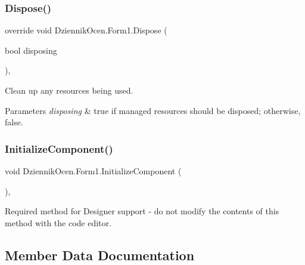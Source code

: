 \mbox{\label{class_dziennik_ocen_1_1_form1_a64a7924e831567e78bb499a6baa0e543}} 
\subsubsection{\texorpdfstring{Dispose()}{Dispose()}}
{\footnotesize\ttfamily override void Dziennik\+Ocen.\+Form1.\+Dispose (\begin{DoxyParamCaption}\item[{bool}]{disposing }\end{DoxyParamCaption})\hspace{0.3cm}{\ttfamily [inline]}, {\ttfamily [protected]}}



Clean up any resources being used. 


\begin{DoxyParams}{Parameters}
{\em disposing} & true if managed resources should be disposed; otherwise, false.\\
\hline
\end{DoxyParams}
\mbox{\label{class_dziennik_ocen_1_1_form1_a25d1f1865febb87fc9186127ca72793c}} 
\subsubsection{\texorpdfstring{Initialize\+Component()}{InitializeComponent()}}
{\footnotesize\ttfamily void Dziennik\+Ocen.\+Form1.\+Initialize\+Component (\begin{DoxyParamCaption}{ }\end{DoxyParamCaption})\hspace{0.3cm}{\ttfamily [inline]}, {\ttfamily [private]}}



Required method for Designer support -\/ do not modify the contents of this method with the code editor. 



\subsection{Member Data Documentation}
\mbox{\label{class_dziennik_ocen_1_1_form1_a1bc9483c61d99951b6f2d57d24b4fe60}} 
